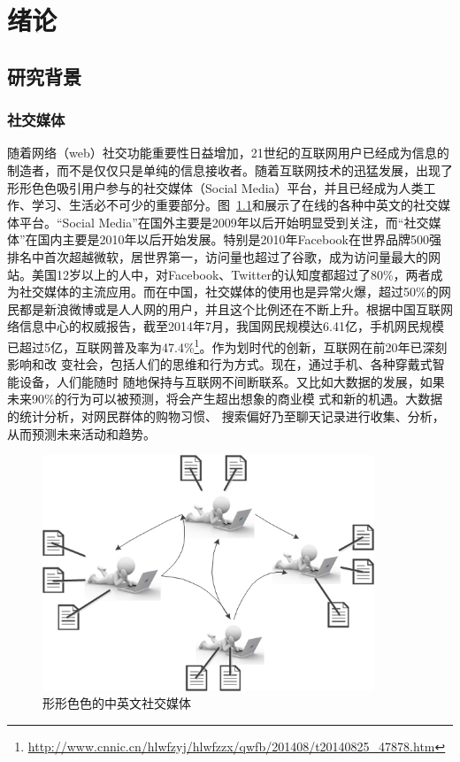 \chapter{绪论}
\label{Intro}

\section{研究背景}

\subsection{社交媒体}
随着网络（web）社交功能重要性日益增加，21世纪的互联网用户已经成为信息的制造者，而不是仅仅只是单纯的信息接收者。随着互联网技术的迅猛发展，出现了形形色色吸引用户参与的社交媒体（Social Media）平台，并且已经成为人类工作、学习、生活必不可少的重要部分。图~\ref{socialmedia}和展示了在线的各种中英文的社交媒体平台。“Social Media”在国外主要是2009年以后开始明显受到关注，而“社交媒体”在国内主要是2010年以后开始发展。特别是2010年Facebook在世界品牌500强排名中首次超越微软，居世界第一，访问量也超过了谷歌，成为访问量最大的网站。美国12岁以上的人中，对Facebook、Twitter的认知度都超过了80\%，两者成为社交媒体的主流应用。而在中国，社交媒体的使用也是异常火爆，超过50\%的网民都是新浪微博或是人人网的用户，并且这个比例还在不断上升。根据中国互联网络信息中心的权威报告，截至2014年7月，我国网民规模达6.41亿，手机网民规模已超过5亿，互联网普及率为47.4\%\footnote{\url{http://www.cnnic.cn/hlwfzyj/hlwfzzx/qwfb/201408/t20140825_47878.htm}}。作为划时代的创新，互联网在前20年已深刻影响和改
变社会，包括人们的思维和行为方式。现在，通过手机、各种穿戴式智能设备，人们能随时 随地保持与互联网不间断联系。又比如大数据的发展，如果未来90\%的行为可以被预测，将会产生超出想象的商业模 式和新的机遇。大数据的统计分析，对网民群体的购物习惯、 搜索偏好乃至聊天记录进行收集、分析，从而预测未来活动和趋势。


\begin{figure}[htp]
\centering
\includegraphics[height=200pt]{socialmedia.png}
\caption{形形色色的中英文社交媒体}
\label{socialmedia}
\end{figure}

